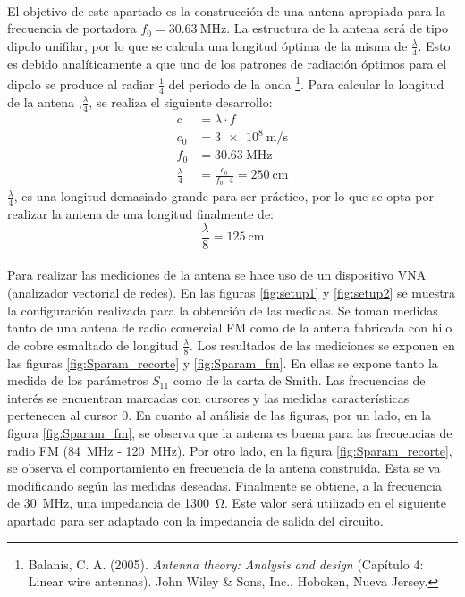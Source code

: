 \paragraph{}
El objetivo de este apartado es la construcción de una antena apropiada para la frecuencia de portadora $f_0 = \SI{30.63}{\mega\hertz}$.
La estructura de la antena será de tipo dipolo unifilar, por lo que se calcula una longitud óptima de la misma de $\frac{\lambda}{4}$.
Esto es debido analíticamente a que uno de los patrones de radiación óptimos para el dipolo se produce al radiar $\frac{1}{4}$ del periodo de la onda \footnote{Balanis, C. A. (2005). \textit{Antenna theory: Analysis and design} (Capítulo 4: Linear wire antennas). John Wiley \& Sons, Inc., Hoboken, Nueva Jersey.}. Para calcular la longitud de la antena ,$\frac{\lambda}{4}$, se realiza el siguiente desarrollo:
\begin{align}
   c &= \lambda \cdot f \\
   c_0 &= \SI{3e8}{\metre\per\second} \\
	f_0 &= \SI{30.63}{\mega\hertz} \\
	\frac{\lambda}{4} &= \frac{c_0}{f_0 \cdot 4} = \SI{250}{\centi\metre}
\end{align}
$\frac{\lambda}{4}$, es una longitud demasiado grande para ser práctico, por lo que se opta por realizar la antena de una longitud finalmente de: $$\frac{\lambda}{8} = \SI{125}{\centi\metre}$$ 
\paragraph{}
Para realizar las mediciones de la antena se hace uso de un dispositivo VNA (analizador vectorial de redes). En las figuras \ref{fig:setup1} y \ref{fig:setup2} se muestra la configuración realizada para la obtención de las medidas.
Se toman medidas tanto de una antena de radio comercial FM como de la antena fabricada con hilo de cobre esmaltado de longitud $\frac{\lambda}{8}$. 
Los resultados de las mediciones se exponen en las figuras \ref{fig:Sparam_recorte} y \ref{fig:Sparam_fm}. En ellas se expone tanto la medida de los par\'ametros $S_{11}$ como de la carta de Smith. Las frecuencias de inter\'es se encuentran marcadas con cursores y las medidas caracter\'isticas pertenecen al cursor 0. 
En cuanto al an\'alisis de las figuras, por un lado, en la figura \ref{fig:Sparam_fm}, se observa que la antena es buena para las frecuencias de radio FM (\SI{84}{\mega\hertz} - \SI{120}{\mega\hertz}). 
Por otro lado, en la figura \ref{fig:Sparam_recorte}, se observa el comportamiento en frecuencia de la antena construida. Esta se va modificando según las medidas deseadas. Finalmente se obtiene, a la frecuencia de \SI{30}{\mega\hertz}, una impedancia de \SI{1300}{\ohm}. Este valor ser\'a utilizado en el siguiente apartado para ser adaptado con la impedancia de salida del circuito.

